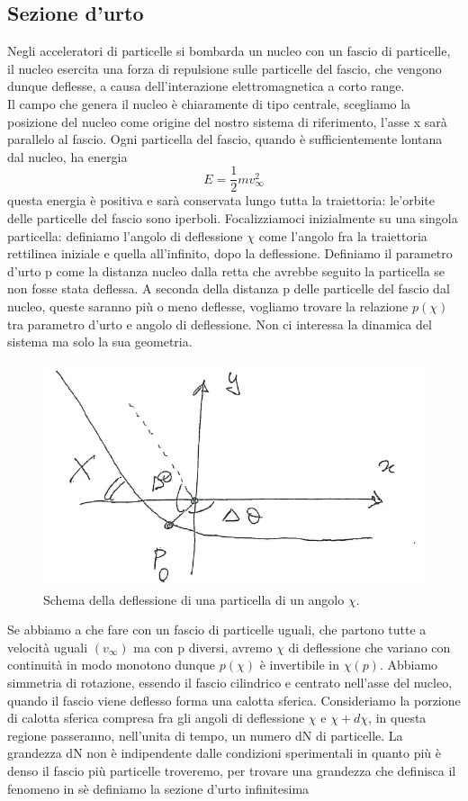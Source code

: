 \documentclass[
10pt, %
a4paper, %
oneside, %
headinclude,footinclude, %
BCOR5mm, %
]{scrartcl}
\begin{document}
\subsection{Sezione d'urto}
Negli acceleratori di particelle si bombarda un nucleo con un fascio di particelle, il nucleo esercita una forza di repulsione sulle particelle del fascio, che vengono dunque deflesse, a causa dell'interazione elettromagnetica a corto range.\\
Il campo che genera il nucleo è chiaramente di tipo centrale, scegliamo la posizione del nucleo come origine del nostro sistema di riferimento, l'asse x sarà parallelo al fascio. Ogni particella del fascio, quando è sufficientemente lontana dal nucleo, ha energia
\[E = \frac{1}{2}mv_\infty^2\]
questa energia è positiva e sarà conservata lungo tutta la traiettoria: le'orbite delle particelle del fascio sono iperboli. Focalizziamoci inizialmente su una singola particella: definiamo l'angolo di deflessione $\chi$ come l'angolo fra la traiettoria rettilinea iniziale e quella all'infinito, dopo la deflessione. Definiamo il parametro d'urto p come la distanza nucleo dalla retta che avrebbe seguito la particella se non fosse stata deflessa. A seconda della distanza p delle particelle del fascio dal nucleo, queste saranno più o meno deflesse, vogliamo trovare la relazione \(p(\chi)\) tra parametro d'urto e angolo di deflessione. Non ci interessa la dinamica del sistema ma solo la sua geometria. 
\begin{figure}[h!]
	\centering
	\includegraphics[width=0.6\linewidth]{sezione-urto}
	\caption{Schema della deflessione di una particella di un angolo \(\chi\).}
	\label{fig:sezione-urto}
\end{figure}
\FloatBarrier
Se abbiamo a che fare con un fascio di particelle uguali, che partono tutte a velocità uguali \((v_\infty)\) ma con p diversi, avremo $\chi$ di deflessione che variano con continuità in modo monotono dunque \(p(\chi)\) è invertibile in \(\chi(p)\). Abbiamo simmetria di rotazione, essendo il fascio cilindrico e centrato nell'asse del nucleo, quando il fascio viene deflesso forma una calotta sferica. Consideriamo la porzione di calotta sferica compresa fra gli angoli di deflessione \(\chi\) e $\chi+d\chi$, in questa regione passeranno, nell'unita di tempo, un numero dN di particelle. La grandezza dN non è indipendente dalle condizioni sperimentali in quanto più è denso il fascio più particelle troveremo, per trovare una grandezza che definisca il fenomeno in sè definiamo la sezione d'urto infinitesima
\end{document}
